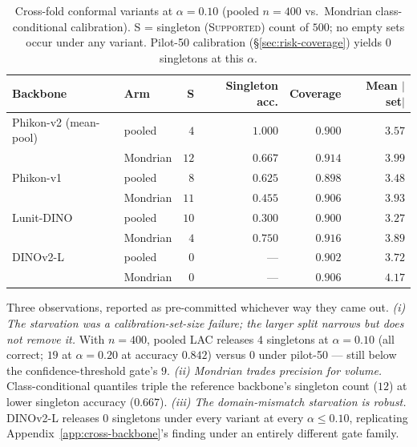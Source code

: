 \documentclass{article}
\newcommand{\SafeNum}[1]{#1}
\begin{document}
\begin{table}[h]
\centering
\caption{Cross-fold conformal variants at $\alpha{=}\SafeNum{0.10}$ (pooled $n{=}\SafeNum{400}$ vs.\ Mondrian class-conditional calibration). S = singleton (\textsc{Supported}) count of $\SafeNum{500}$; no empty sets occur under any variant. Pilot-50 calibration (\S\ref{sec:risk-coverage}) yields $\SafeNum{0}$ singletons at this $\alpha$.}
\label{tab:conformal-variants}
\begin{tabular}{@{}llrrrr@{}}
\toprule
Backbone & Arm & S & Singleton acc. & Coverage & Mean $|$set$|$ \\
\midrule
Phikon-v2 (mean-pool) & pooled   & $\SafeNum{4}$  & $\SafeNum{1.000}$ & $\SafeNum{0.900}$ & $\SafeNum{3.57}$ \\
                      & Mondrian & $\SafeNum{12}$ & $\SafeNum{0.667}$ & $\SafeNum{0.914}$ & $\SafeNum{3.99}$ \\
Phikon-v1             & pooled   & $\SafeNum{8}$  & $\SafeNum{0.625}$ & $\SafeNum{0.898}$ & $\SafeNum{3.48}$ \\
                      & Mondrian & $\SafeNum{11}$ & $\SafeNum{0.455}$ & $\SafeNum{0.906}$ & $\SafeNum{3.93}$ \\
Lunit-DINO            & pooled   & $\SafeNum{10}$ & $\SafeNum{0.300}$ & $\SafeNum{0.900}$ & $\SafeNum{3.27}$ \\
                      & Mondrian & $\SafeNum{4}$  & $\SafeNum{0.750}$ & $\SafeNum{0.916}$ & $\SafeNum{3.89}$ \\
DINOv2-L              & pooled   & $\SafeNum{0}$  & ---               & $\SafeNum{0.902}$ & $\SafeNum{3.72}$ \\
                      & Mondrian & $\SafeNum{0}$  & ---               & $\SafeNum{0.906}$ & $\SafeNum{4.17}$ \\
\bottomrule
\end{tabular}
\end{table}

Three observations, reported as pre-committed whichever way they came out. \emph{(i) The starvation was a calibration-set-size failure; the larger split narrows but does not remove it.} With $n{=}\SafeNum{400}$, pooled LAC releases $\SafeNum{4}$ singletons at $\alpha{=}\SafeNum{0.10}$ (all correct; $\SafeNum{19}$ at $\alpha{=}\SafeNum{0.20}$ at accuracy $\SafeNum{0.842}$) versus $\SafeNum{0}$ under pilot-50 --- still below the confidence-threshold gate's $\SafeNum{9}$. \emph{(ii) Mondrian trades precision for volume.} Class-conditional quantiles triple the reference backbone's singleton count ($\SafeNum{12}$) at lower singleton accuracy ($\SafeNum{0.667}$). \emph{(iii) The domain-mismatch starvation is robust.} DINOv2-L releases $\SafeNum{0}$ singletons under every variant at every $\alpha \le \SafeNum{0.10}$, replicating Appendix~\ref{app:cross-backbone}'s finding under an entirely different gate family.
\end{document}
